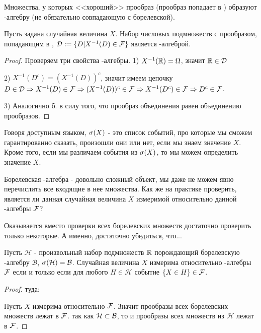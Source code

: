 {Множества, у которых <<хороший>> прообраз (прообраз попадает в \F) образуют \s-алгебру (не обязательно совпадающую с борелевской).
\begin{myth} Пусть задана случайная величина $X$. Набор числовых подмножеств с прообразом, попадающим в \F, $\mathcal{D}:=\{D|X^{-1}(D)\in\mathcal{F}\}$ является \s-алгеброй.
\end{myth}
\begin{proof} Проверяем три свойства \s-алгебры.
1) $X^{-1}(\mathbb{R})=\Omega$, значит $\mathbb{R}\in\mathcal{D}$

2) $X^{-1}(D^{c})=(X^{-1}(D))^{c}$, значит имеем цепочку $D\in\mathcal{D}\Rightarrow X^{-1}(D)\in\mathcal{F} \Rightarrow (X^{-1}(D))^{c}\in\mathcal{F} \Rightarrow X^{-1}(D^{c})\in\mathcal{F} \Rightarrow D^{c}\in\mathcal{F}$.

3) Аналогично б. в силу того, что прообраз объединения равен объединению прообразов.

\end{proof}








Говоря доступным языком, $\sigma(X)$ - это список событий, про которые мы сможем гарантированно сказать, произошли они или нет, если мы знаем значение $X$. Кроме того, если мы различаем события из $\sigma(X)$, то мы можем определить значение $X$.


Борелевская \s-алгебра - довольно сложный объект, мы даже не можем явно перечислить все входящие в нее множества. Как же на практике проверить, является ли данная случайная величина $X$ измеримой относительно данной \s-алгебры $\mathcal{F}$?

Оказывается вместо проверки всех борелевских множеств достаточно проверить только некоторые. А именно, достаточно убедиться, что...

\begin{myth}
Пусть $\mathcal{H}$ - произвольный набор подмножеств $\mathbb{R}$ порождающий борелевскую \s-алгебру $\mathcal{B}$, $\sigma(\mathcal{H})=\mathcal{B}$. Случайная величина $X$ измерима относительно \s-алгебры $\mathcal{F}$ если и только если для любого $H\in\mathcal{H}$ событие $\{X\in H\}\in\mathcal{F}$.
\end{myth}
\begin{proof}

туда: 

Пусть $X$ измерима относительно $\mathcal{F}$. Значит прообразы всех борелевских множеств лежат в $\mathcal{F}$.  так как $\mathcal{H}\subset \mathcal{B}$, то и прообразы всех множеств из $\mathcal{H}$ лежат в $\mathcal{F}$.


\end{proof}}
